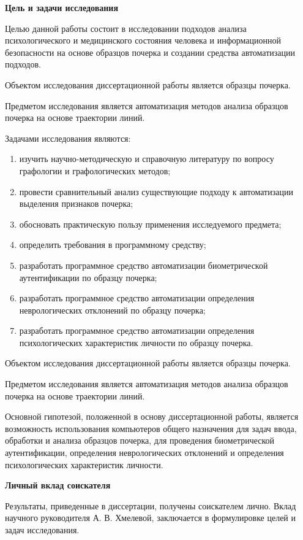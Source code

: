
\textbf{Цель и задачи исследования}
\bigskip

Целью данной работы состоит в исследовании подходов анализа психологического и медицинского состояния человека и информационной безопасности на основе образцов почерка и создании средства автоматизации подходов.

Объектом исследования диссертационной работы является образцы почерка.

Предметом исследования является автоматизация методов анализа образцов почерка на основе траектории линий.

Задачами исследования являются:
\begin{enumerate}
  \item изучить научно-методическую и справочную литературу по вопросу графологии и графологических методов;
  \item провести сравнительный анализ существующие подходу к автоматизации выделения признаков почерка;
  \item обосновать практическую пользу применения исследуемого \mbox{предмета};
  \item определить требования в программному средству;
  \item разработать программное средство автоматизации биометрической аутентификации по образцу почерка;
  \item разработать программное средство автоматизации определения неврологических отклонений по образцу почерка;
  \item разработать программное средство автоматизации определения психологических характеристик личности по образцу почерка.
\end{enumerate}
Объектом исследования диссертационной работы является образцы почерка.

Предметом исследования является автоматизация методов анализа образцов почерка на основе траектории линий.

Основной гипотезой, положенной в основу диссертационной работы, является возможность использования компьютеров общего назначения для задач ввода, обработки и анализа образцов почерка, для проведения биометрической аутентификации, определения неврологических отклонений и определения психологических характеристик личности. 

\bigskip
\textbf{Личный вклад соискателя}
\bigskip

Результаты, приведенные в диссертации, получены  соискателем лично. Вклад научного руководителя А. В. Хмелевой, заключается в формулировке целей и задач исследования.

